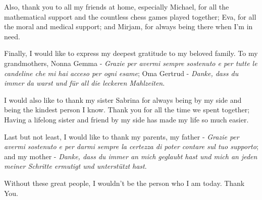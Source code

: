 \documentclass[twoside,openright]{scrreprt}
\begin{document}
Also, thank you to all my friends at home, especially Michael, for all the mathematical support and the countless chess games played together; Eva, for all the moral and medical support; and Mirjam, for always being there when I'm in need.

Finally, I would like to express my deepest gratitude to my beloved family. To my grandmothers, Nonna Gemma - \emph{Grazie per avermi sempre sostenuto e per tutte le candeline che mi hai acceso per ogni esame}; Oma Gertrud - \emph{Danke, dass du immer da warst und für all die leckeren Mahlzeiten}. 

I would also like to thank my sister Sabrina for always being by my side and being the kindest person I know. Thank you for all the time we spent together; Having a lifelong sister and friend by my side has made my life so much easier.

Last but not least, I would like to thank my parents, my father - \emph{Grazie per avermi sostenuto e per darmi sempre la certezza di poter contare sul tuo supporto}; and my mother - \emph{Danke, dass du immer an mich geglaubt hast und mich an jeden meiner Schritte ermutigt und unterstützt hast}.

Without these great people, I wouldn't be the person who I am today. Thank You.






\cleardoublepage

\tableofcontents

\listoffigures

\listoftables























\printbibliography
%
\end{document}

